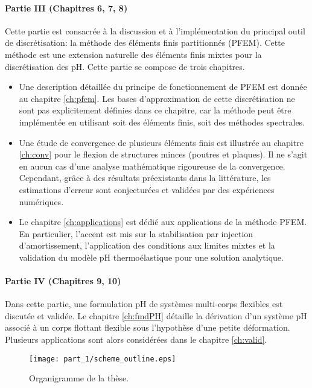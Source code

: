 \paragraph{Partie III (Chapitres 6, 7, 8)}
Cette partie est consacrée à la discussion et à l'implémentation du principal outil de discrétisation: la méthode des éléments finis partitionnés (PFEM). Cette méthode est une extension naturelle des éléments finis mixtes pour la discrétisation des pH. Cette partie se compose de trois chapitres.
\begin{itemize}
\item Une description détaillée du principe de fonctionnement de PFEM est donnée au chapitre \ref{ch:pfem}. Les bases d'approximation de cette discrétisation ne sont pas explicitement définies dans ce chapitre, car la méthode peut être implémentée en utilisant soit des éléments finis, soit des méthodes spectrales.
\item Une étude de convergence de plusieurs éléments finis est illustrée au chapitre \ref{ch:conv} pour le flexion de structures minces (poutres et plaques). Il ne s'agit en aucun cas d'une analyse mathématique rigoureuse de la convergence. Cependant, grâce à des résultats préexistants dans la littérature, les estimations d'erreur sont conjecturées et validées par des expériences numériques.
\item Le chapitre \ref{ch:applications} est dédié aux applications de la méthode PFEM. En particulier, l'accent est mis sur la stabilisation par injection d'amortissement, l'application des conditions aux limites mixtes et la validation du modèle pH thermoélastique pour une solution analytique.
\end{itemize}

\paragraph {Partie IV (Chapitres 9, 10)}
Dans cette partie, une formulation pH de systèmes multi-corps flexibles est discutée et validée. Le chapitre \ref{ch:fmdPH} détaille la dérivation d'un système pH associé à un corps flottant flexible sous l'hypothèse d'une petite déformation. Plusieurs applications sont alors considérées dans le chapitre \ref{ch:valid}.


\begin{sidewaysfigure}
\centering
\texttt{[image: part\_1/scheme\_outline.eps]}%
\caption[]{Organigramme de la thèse.}%
\label{fig:organigramme}%
\end{sidewaysfigure}

